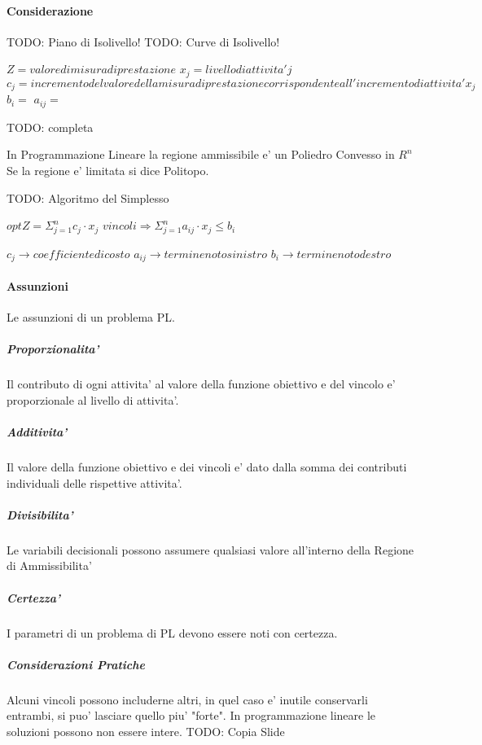 \paragraph{Considerazione}

TODO: Piano di Isolivello!
TODO: Curve di Isolivello!

$Z = valore di misura di prestazione$
$x_j = livello di attivita' j$
$c_j = incremento del valore della misura di prestazione corrispondente all'incremento di attivita' x_j$
$b_i = $
$a_{ij} = $

TODO: completa

In Programmazione Lineare la regione ammissibile e' un Poliedro Convesso in $R^n$
Se la regione e' limitata si dice Politopo.

TODO: Algoritmo del Simplesso

$opt Z = \Sigma _ {j=1} ^ {n} c_j \cdot x_j$
$vincoli \Rightarrow \Sigma _ {j=1} ^ {n} a_{ij} \cdot x_j \leq b_i$

$c_j \rightarrow coefficiente di costo$
$a_{ij} \rightarrow termine noto sinistro$
$b_{i} \rightarrow termine noto destro$

\paragraph{Assunzioni}
Le assunzioni di un problema PL.

\subparagraph{Proporzionalita'}
Il contributo di ogni attivita' al valore della funzione obiettivo e del vincolo e' proporzionale al livello di attivita'.

\subparagraph{Additivita'}
Il valore della funzione obiettivo e dei vincoli e' dato dalla somma dei contributi individuali delle rispettive attivita'.

\subparagraph{Divisibilita'}
Le variabili decisionali possono assumere qualsiasi valore all'interno della Regione di Ammissibilita'

\subparagraph{Certezza'}
I parametri di un problema di PL devono essere noti con certezza.

\subparagraph{Considerazioni Pratiche}

Alcuni vincoli possono includerne altri, in quel caso e' inutile conservarli entrambi, si puo' lasciare quello piu' "forte".
In programmazione lineare le soluzioni possono non essere intere.
TODO: Copia Slide

